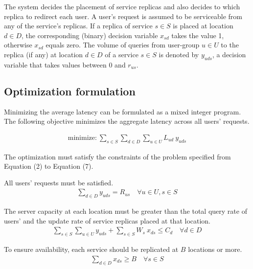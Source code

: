 The system decides the placement of service replicas and also decides to which replica to redirect each user.  A user's request is assumed to be serviceable from any of the service's replicas.  If a replica of service $s\in S$ is placed at location $d \in D$, the corresponding (binary) decision variable $x_{sd}$ takes the value 1,  otherwise $x_{sd}$ equals zero. The volume of queries from user-group $u \in U$ to the replica (if any) at location $d \in D$ of a service $s \in S$ is denoted by  $y_{uds}$,  a decision variable that takes values between $0$ and $r_{us}$.



\subsection{Optimization formulation}

Minimizing the average latency can be formulated as a mixed integer program. The following objective minimizes the aggregate latency across all users' requests.


\begin{eqnarray}
\text{minimize:}\ \sum_{s \in S} \sum_{d \in D} \sum_{u \in U} L_{ud} \ y_{uds}
\end{eqnarray}

The optimization must satisfy the constraints of the problem specified from Equation (2) to Equation (7).

All users' requests must be satisfied.
\begin{eqnarray}
\sum_{d \in D} {y_{uds}} = R_{us} \quad \forall u \in U, s \in S
\end{eqnarray}

The server capacity at each location must be greater than the total  query rate of users' and the update rate of  service replicas  placed at that  location.
\begin{eqnarray}
\sum_{s \in S} \sum_{u \in U} y_{uds} + \sum_{s \in S} W_s\ x_{ds} \leq C_d \quad \forall d \in D
\end{eqnarray}

To ensure availability, each service should be replicated at $B$ locations or more. 
\begin{eqnarray}
\sum_{d \in D} x_{ds} \geq B \quad \forall s \in S
\end{eqnarray}


